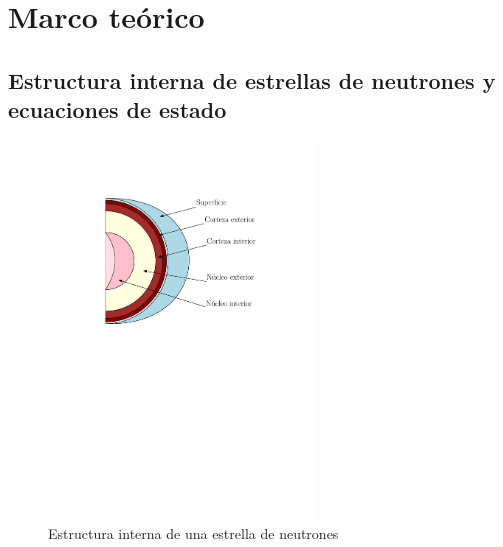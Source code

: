 \chapter{Marco teórico}

\section{Estructura interna de estrellas de neutrones y ecuaciones de estado}

\begin{figure}[H]
    \centering
    \includegraphics[width=200pt]{figures/neutronstar.pdf}
    \caption{Estructura interna de una estrella de neutrones}
    \label{NSS}
\end{figure}